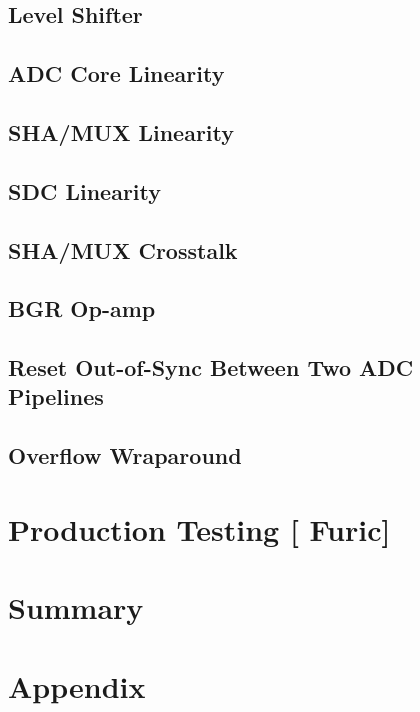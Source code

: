 \documentclass[12pt]{article}
\begin{document}
\subsection{Level Shifter}
\subsection{ADC Core Linearity}
\subsection{SHA/MUX Linearity}
\subsection{SDC Linearity}
\subsection{SHA/MUX Crosstalk}
\subsection{BGR Op-amp}	
\subsection{Reset Out-of-Sync Between Two ADC Pipelines}
\subsection{Overflow Wraparound}


\section{Production Testing   [{\color{red} Furic}] }


\newpage
\section{Summary}  
%	

\newpage
%


\newpage
\section*{Appendix}
%	
\end{document}
